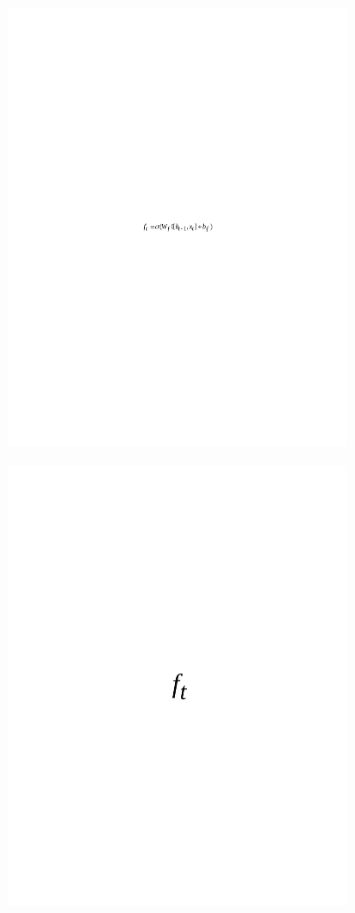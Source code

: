 \begin{figure}[H]
	\centering
	\includegraphics[width=0.8\textwidth]{media/ict/image45}
	\caption*{}
\end{figure}


\begin{figure}[H]
	\centering
	\includegraphics[width=0.8\textwidth]{media/ict/image46}
	\caption*{}
\end{figure}

